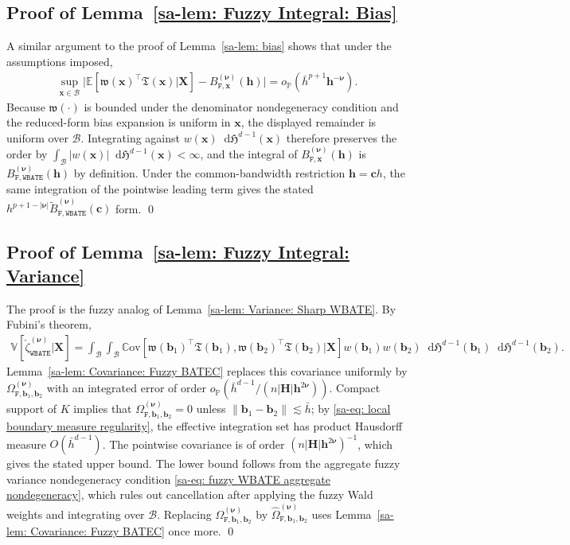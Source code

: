 \documentclass[10pt]{article}
\renewcommand{\P}{\mathbb{P}}
\newcommand{\E}{\mathbb{E}}
\newcommand{\Var}{\mathbb{V}}
\newcommand{\Cov}{\mathbb{C}\mathrm{ov}}
\newcommand{\Haus}{\mathfrak{H}}
\newcommand{\dif}{\mathop{}\!\mathrm{d}}
\newcommand{\bb}{\mathbf{b}}
\newcommand{\bc}{\mathbf{c}}
\newcommand{\bh}{\mathbf{h}}
\newcommand{\bH}{\mathbf{H}}
\newcommand{\bx}{\mathbf{x}}
\newcommand{\bX}{\mathbf{X}}
\newcommand{\bnu}{\boldsymbol{\nu}}
\newcommand{\B}{\mathcal{B}}
\begin{document}
\subsection{Proof of Lemma~\ref{sa-lem: Fuzzy Integral: Bias}}

A similar argument to the proof of Lemma~\ref{sa-lem: bias} shows that under the assumptions imposed,
\begin{align*}
    \sup_{\bx \in \B} \big|\E[\mathfrak{w}(\bx)^\top\mathfrak{T}(\bx)|\bX] - B_{\mathtt{F},\bx}^{(\bnu)}(\bh) \big| = o_{\P}(\bar{h}^{p+1}\bh^{-\bnu}).
\end{align*}
Because $\mathfrak{w}(\cdot)$ is bounded under the denominator nondegeneracy condition and the reduced-form bias expansion is uniform in $\bx$, the displayed remainder is uniform over $\B$. Integrating against $w(\bx)\dif\Haus^{d-1}(\bx)$ therefore preserves the order by $\int_{\B} |w(\bx)| \dif\Haus^{d-1}(\bx)<\infty$, and the integral of $B_{\mathtt{F},\bx}^{(\bnu)}(\bh)$ is $B_{\mathtt{F,WBATE}}^{(\bnu)}(\bh)$ by definition. Under the common-bandwidth restriction $\bh=\bc h$, the same integration of the pointwise leading term gives the stated $h^{p+1-|\bnu|}\widetilde B_{\mathtt{F,WBATE}}^{(\bnu)}(\bc)$ form.
\qed

\subsection{Proof of Lemma~\ref{sa-lem: Fuzzy Integral: Variance}}

The proof is the fuzzy analog of Lemma~\ref{sa-lem: Variance: Sharp WBATE}. By Fubini's theorem,
\begin{align*}
    \Var[\check{\zeta}_{\mathtt{WBATE}}^{(\bnu)}|\bX]
    = \int_{\B}\int_{\B}
      \Cov[\mathfrak{w}(\bb_1)^\top\mathfrak{T}(\bb_1),\mathfrak{w}(\bb_2)^\top\mathfrak{T}(\bb_2)|\bX]
      w(\bb_1)w(\bb_2)\dif\Haus^{d-1}(\bb_1)\dif\Haus^{d-1}(\bb_2).
\end{align*}
Lemma~\ref{sa-lem: Covariance: Fuzzy BATEC} replaces this covariance uniformly by $\Omega_{\mathtt{F},\bb_1,\bb_2}^{(\bnu)}$ with an integrated error of order $o_{\P}(\bar{h}^{d-1}/(n|\bH|\bh^{2\bnu}))$. Compact support of $K$ implies that $\Omega_{\mathtt{F},\bb_1,\bb_2}^{(\bnu)}=0$ unless $\|\bb_1-\bb_2\|\lesssim \bar{h}$; by \eqref{sa-eq: local boundary measure regularity}, the effective integration set has product Hausdorff measure $O(\bar{h}^{d-1})$. The pointwise covariance is of order $(n|\bH|\bh^{2\bnu})^{-1}$, which gives the stated upper bound. The lower bound follows from the aggregate fuzzy variance nondegeneracy condition \eqref{sa-eq: fuzzy WBATE aggregate nondegeneracy}, which rules out cancellation after applying the fuzzy Wald weights and integrating over $\B$. Replacing $\Omega_{\mathtt{F},\bb_1,\bb_2}^{(\bnu)}$ by $\widehat{\Omega}_{\mathtt{F},\bb_1,\bb_2}^{(\bnu)}$ uses Lemma~\ref{sa-lem: Covariance: Fuzzy BATEC} once more.
\qed
\end{document}
